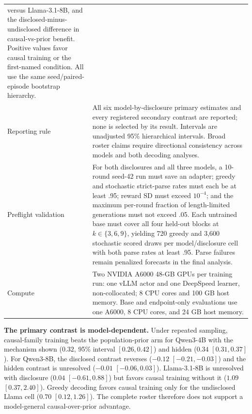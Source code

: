 \begin{center}
\begin{minipage}{\linewidth}
\begin{tabular}{p{.29\linewidth}p{.66\linewidth}}
versus Llama-3.1-8B, and the disclosed-minus-undisclosed difference in
causal-vs-prior benefit.  Positive values favor causal training or the first-named
condition. All use the same seed/paired-episode bootstrap hierarchy. \\
Reporting rule & All six model-by-disclosure primary estimates and every
registered secondary contrast are reported; none is selected by its result.
Intervals are unadjusted 95\% hierarchical intervals. Broad roster claims
require directional consistency across models and both decoding analyses. \\
Preflight validation & For both disclosures and all three models, a 10-round
seed-42 run must save an adapter; greedy and stochastic strict-parse rates must
each be at least .95; reward SD must exceed $10^{-4}$; and the maximum per-round
fraction of length-limited generations must not exceed .05. Each untrained base
must cover all four held-out blocks at $k\in\{3,6,9\}$, yielding 720 greedy and
3,600 stochastic scored draws per model/disclosure cell with both parse rates at
least .95. Parse failures remain penalized forecasts in the final analysis. \\
Compute & Two NVIDIA A6000 48-GB GPUs per training run: one vLLM actor and one
DeepSpeed learner, non-collocated; 8 CPU cores and 100 GB host memory.  Base and
endpoint-only evaluations use one A6000, 8 CPU cores, and 24 GB host memory. \\
\bottomrule
\end{tabular}
\end{minipage}
\end{center}
\begin{center}
\begin{minipage}{\linewidth}
\centering
{}
\label{tab:exp3c-full-overall}
\scriptsize
\setlength{\tabcolsep}{2pt}
\resizebox{\linewidth}{!}{%

}
\end{minipage}
\end{center}

\noindent\textbf{The primary contrast is model-dependent.}
Under repeated sampling, causal-family training beats the population-prior arm
for Qwen3-4B with the mechanism shown ($0.32$, 95\% interval $[0.26,0.42]$) and
hidden ($0.34$ $[0.31,0.37]$). For Qwen3-8B, the disclosed contrast reverses
($-0.12$ $[-0.21,-0.03]$) and the hidden contrast is unresolved
($-0.01$ $[-0.06,0.03]$). Llama-3.1-8B is unresolved with disclosure
($0.04$ $[-0.61,0.88]$) but favors causal training without it
($1.09$ $[0.37,2.40]$). Greedy decoding favors causal training only for the
undisclosed Llama cell ($0.70$ $[0.12,1.26]$). The complete roster therefore
does not support a model-general causal-over-prior advantage.

